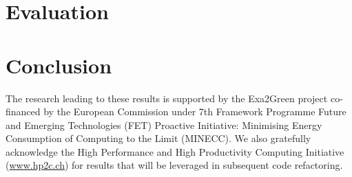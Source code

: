 \documentclass[twocolumn]{svjour3}
\DeclareRobustCommand\IPCClongname{}
\begin{document}
\section{Evaluation}
\label{sec:4}


\section{Conclusion}
\label{concl}



\begin{acknowledgements}
The research  leading to these  results is supported by  the Exa2Green
project  co-financed by  the European  Commission under  7th Framework
Programme Future and Emerging Technologies (FET) Proactive Initiative:
Minimising Energy  Consumption of Computing to the  Limit (MINECC). We
also gratefully acknowledge the High Performance and High Productivity
Computing  Initiative  (\url{www.hp2c.ch}) for  results  that will  be
leveraged in subsequent code refactoring.
\end{acknowledgements}

\DeclareRobustCommand\IPCClongname{ - Intergovernmental Panel on Climate Change}



\end{document}

